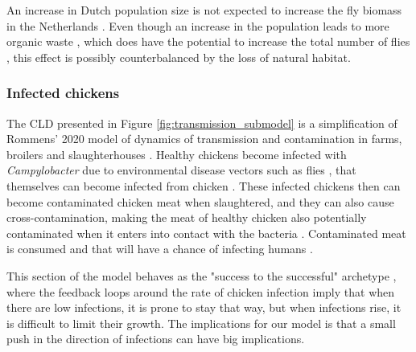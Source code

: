 An increase in Dutch population size is not expected to increase the fly biomass in the Netherlands \parencite{guenat_effects_2019}. Even though an increase in the population leads to more organic waste \parencite{garcia-garcia_framework_2015}, which does have the potential to increase the total number of flies \parencite{imai_population_1984, rozendaal_houseflies_1997}, this effect is possibly counterbalanced by the loss of natural habitat.




\subsubsection*{Infected chickens}
The CLD presented in Figure \ref{fig:transmission_submodel} is a simplification of Rommens' 2020 model of dynamics of transmission  and contamination in farms, broilers and slaughterhouses \parencite{rommens_infected_2020}. Healthy chickens become infected with \textit{Campylobacter} due to environmental disease vectors such as flies \parencite{royden_role_2016}, that themselves can become infected from chicken \parencite{skovgard_retention_2011}. These infected chickens then can become contaminated chicken meat when slaughtered, and they can also cause cross-contamination, making the meat of healthy chicken also potentially contaminated when it enters into contact with the bacteria \parencite{berndtson_campylobacter_1996}. Contaminated meat is consumed and that will have a chance of infecting humans \parencite{wilson_tracing_2008}.

This section of the model behaves as the "success to the successful" archetype \parencite{pruyt_triple_2013}, where the feedback loops around the rate of chicken infection imply that when there are low infections, it is prone to stay that way, but when infections rise, it is difficult to limit their growth. The implications for our model is that a small push in the direction of infections can have big implications.

